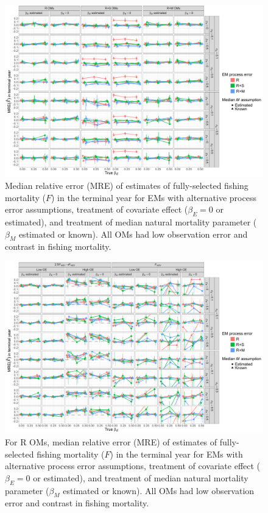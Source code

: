 \documentclass[
  12pt,
]{article}
\begin{document}
\begin{landscape}
\begin{figure}
\begin{center}
\includegraphics[height = \textheight]{terminal_year_F_bias_main}
\end{center}
\caption{Median relative error (MRE) of estimates of fully-selected fishing mortality ($F$) in the terminal year for EMs with alternative process error assumptions, treatment of covariate effect ($\beta_E = 0$ or estimated), and treatment of median natural mortality parameter ($\beta_M$ estimated or known). All OMs had low observation error and contrast in fishing mortality.}\label{terminal_F_bias}
\end{figure}
\end{landscape}

\begin{landscape}
\begin{figure}
\begin{center}
\includegraphics[height = \textheight]{terminal_year_F_bias_Rom}
\end{center}
\caption{For R OMs, median relative error (MRE) of estimates of fully-selected fishing mortality ($F$) in the terminal year for EMs with alternative process error assumptions, treatment of covariate effect ($\beta_E = 0$ or estimated), and treatment of median natural mortality parameter ($\beta_M$ estimated or known). All OMs had low observation error and contrast in fishing mortality.}\label{terminal_F_bias_Rom}
\end{figure}
\end{landscape}
\end{document}
